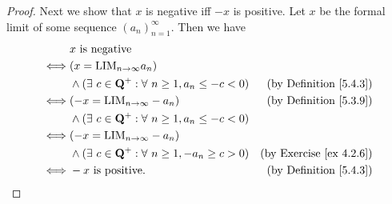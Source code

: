 \begin{proof}
    Next we show that \(x\) is negative iff \(-x\) is positive.
    Let \(x\) be the formal limit of some sequence \((a_n)_{n = 1}^{\infty}\).
    Then we have
    \begin{align*}
             & x \text{ is negative}                                                                                          \\
        \iff & (x = \text{LIM}_{n \to \infty} a_n)                                                                            \\
             & \land (\exists\ c \in \mathbf{Q}^+ : \forall\ n \geq 1, a_n \leq -c < 0) & \text{(by Definition \ref{5.4.3})}  \\
        \iff & (-x = \text{LIM}_{n \to \infty} -a_n)                                    & \text{(by Definition \ref{5.3.9})}  \\
             & \land (\exists\ c \in \mathbf{Q}^+ : \forall\ n \geq 1, a_n \leq -c < 0)                                       \\
        \iff & (-x = \text{LIM}_{n \to \infty} -a_n)                                                                          \\
             & \land (\exists\ c \in \mathbf{Q}^+ : \forall\ n \geq 1, -a_n \geq c > 0) & \text{(by Exercise \ref{ex 4.2.6})} \\
        \iff & -x \text{ is positive}.                                                  & \text{(by Definition \ref{5.4.3})}
    \end{align*}


\end{proof}
